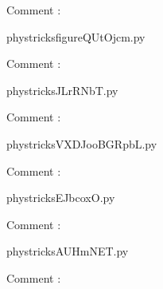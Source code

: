     Comment : 

    \clearpage
    


    \newcommand{\CaptionFigfigureQUtOjcm}{<+Type your caption here+>}
    \begin{center}
        
    \end{center}
    phystricksfigureQUtOjcm.py

    Comment : 

    \clearpage
    


    \newcommand{\CaptionFigJLrRNbT}{<+Type your caption here+>}
    \begin{center}
        
    \end{center}
    phystricksJLrRNbT.py

    Comment : 

    \clearpage
    


    \newcommand{\CaptionFigVXDJooBGRpbL}{<+Type your caption here+>}
    \begin{center}
        
    \end{center}
    phystricksVXDJooBGRpbL.py

    Comment : 

    \clearpage
    


    \newcommand{\CaptionFigEJbcoxO}{<+Type your caption here+>}
    \begin{center}
        
    \end{center}
    phystricksEJbcoxO.py

    Comment : 

    \clearpage
    


    \newcommand{\CaptionFigAUHmNET}{<+Type your caption here+>}
    \begin{center}
        
    \end{center}
    phystricksAUHmNET.py

    Comment : 

    \clearpage
    


